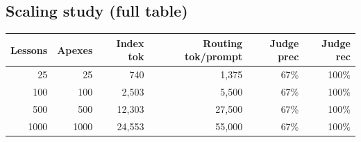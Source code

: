 \subsection{Scaling study (full table)}

\begin{table}[h]
  \centering
  \begin{tabular}{rrrrrr}
    \toprule
    Lessons & Apexes & Index tok & Routing tok/prompt & Judge prec & Judge rec \\
    \midrule
    25 & 25 & 740 & 1,375 & 67\% & 100\% \\
    100 & 100 & 2,503 & 5,500 & 67\% & 100\% \\
    500 & 500 & 12,303 & 27,500 & 67\% & 100\% \\
    1000 & 1000 & 24,553 & 55,000 & 67\% & 100\% \\
    \bottomrule
  \end{tabular}
\end{table}
